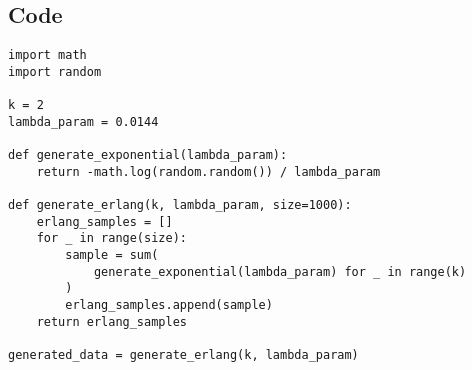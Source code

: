 

\subsection{Code}

\begin{lstlisting}
import math
import random

k = 2
lambda_param = 0.0144

def generate_exponential(lambda_param):
    return -math.log(random.random()) / lambda_param

def generate_erlang(k, lambda_param, size=1000):
    erlang_samples = []
    for _ in range(size):
        sample = sum(
            generate_exponential(lambda_param) for _ in range(k)
        )
        erlang_samples.append(sample)
    return erlang_samples

generated_data = generate_erlang(k, lambda_param)
\end{lstlisting}
